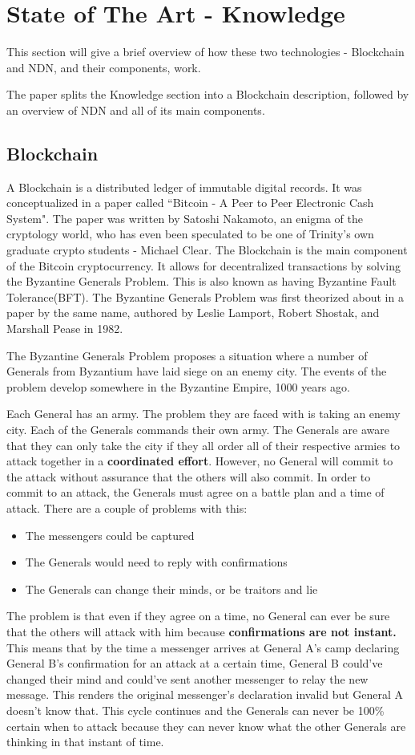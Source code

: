 \section{State of The Art - Knowledge}
This section will give a brief overview of how these two technologies - Blockchain and NDN, and their components, work.\par 
The paper splits the Knowledge section into a Blockchain description, followed by an overview of NDN and all of its main components.
\subsection{Blockchain}
A Blockchain is a distributed ledger of immutable digital records\cite{012}. It was conceptualized in a paper called ``Bitcoin - A Peer to Peer Electronic Cash System". The paper was written by Satoshi Nakamoto, an enigma of the cryptology world, who has even been speculated to be one of Trinity's own graduate crypto students - Michael Clear. The Blockchain is the main component of the Bitcoin cryptocurrency. It allows for decentralized transactions by solving the Byzantine Generals Problem\cite{013}. This is also known as having Byzantine Fault Tolerance(BFT). The Byzantine Generals Problem was first theorized about in a paper by the same name, authored by Leslie Lamport, Robert Shostak, and Marshall Pease in 1982. \par 
The Byzantine Generals Problem proposes a situation where a number of Generals from Byzantium have laid siege on an enemy city. The events of the problem develop somewhere in the Byzantine Empire, 1000 years ago. \par
Each General has an army. The problem they are faced with is taking an enemy city. Each of the Generals commands their own army. The Generals are aware that they can only take the city if they all order all of their respective armies to attack together in a \textbf{coordinated effort}. However, no General will commit to the attack without assurance that the others will also commit. In order to commit to an attack, the Generals must agree on a battle plan and a time of attack. There are a couple of problems with this:
\begin{itemize}
\item The messengers could be captured
\item The Generals would need to reply with confirmations
\item The Generals can change their minds, or be traitors and lie
\end{itemize}
The problem is that even if they agree on a time, no General can ever be sure that the others will attack with him because \textbf{confirmations are not instant.} This means that by the time a messenger arrives at General A's camp declaring General B's confirmation for an attack at a certain time, General B could've changed their mind and could've sent another messenger to relay the new message. This renders the original messenger's declaration invalid but General A doesn't know that. This cycle continues and the Generals can never be 100\% certain when to attack because they can never know what the other Generals are thinking in that instant of time.

